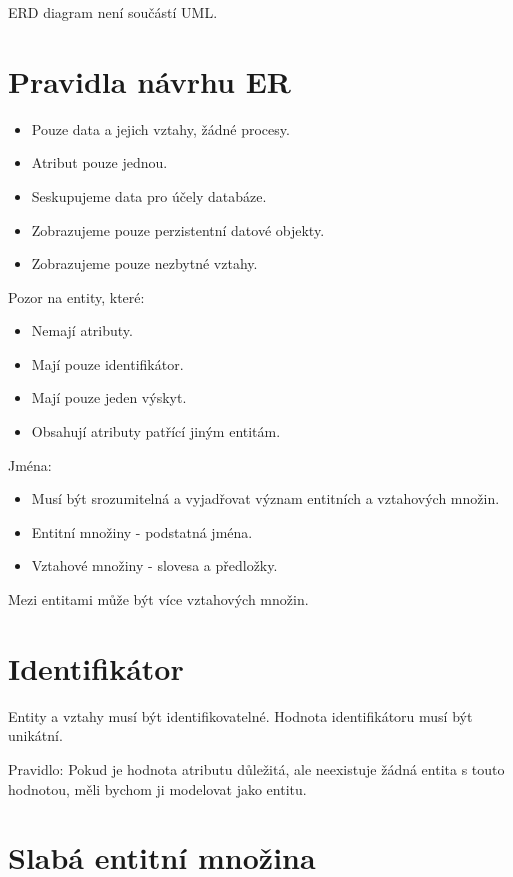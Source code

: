 \documentclass{article}
\begin{document}
ERD diagram není součástí UML.

\section{Pravidla návrhu ER}

\begin{itemize}
    \item Pouze data a jejich vztahy, žádné procesy.
    \item Atribut pouze jednou.
    \item Seskupujeme data pro účely databáze.
    \item Zobrazujeme pouze perzistentní datové objekty.
    \item Zobrazujeme pouze nezbytné vztahy.
\end{itemize}

Pozor na entity, které:
\begin{itemize}
    \item Nemají atributy.
    \item Mají pouze identifikátor.
    \item Mají pouze jeden výskyt.
    \item Obsahují atributy patřící jiným entitám.
\end{itemize}

Jména:
\begin{itemize}
    \item Musí být srozumitelná a vyjadřovat význam entitních a vztahových množin.
    \item Entitní množiny - podstatná jména.
    \item Vztahové množiny - slovesa a předložky.
\end{itemize}

Mezi entitami může být více vztahových množin.

\section{Identifikátor}

Entity a vztahy musí být identifikovatelné.
Hodnota identifikátoru musí být unikátní.

Pravidlo: Pokud je hodnota atributu důležitá, ale neexistuje žádná entita s touto hodnotou, měli bychom ji modelovat jako entitu.

\section{Slabá entitní množina}
\end{document}
